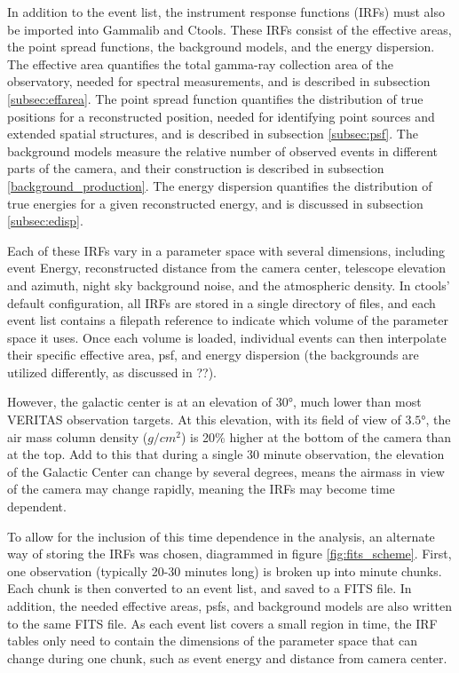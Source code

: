 In addition to the event list, the instrument response functions (IRFs) must also be imported into Gammalib and Ctools.
These IRFs consist of the effective areas, the point spread functions, the background models, and the energy dispersion.
The effective area quantifies the total gamma-ray collection area of the observatory, needed for spectral measurements, and is described in subsection \ref{subsec:effarea}.
The point spread function quantifies the distribution of true positions for a reconstructed position, needed for identifying point sources and extended spatial structures, and is described in subsection \ref{subsec:psf}.
The background models measure the relative number of observed events in different parts of the camera, and their construction is described in subsection \ref{background_production}.
The energy dispersion quantifies the distribution of true energies for a given reconstructed energy, and is discussed in subsection \ref{subsec:edisp}.

Each of these IRFs vary in a parameter space with several dimensions, including event Energy, reconstructed distance from the camera center, telescope elevation and azimuth, night sky background noise, and the atmospheric density.
In ctools' default configuration, all IRFs are stored in a single directory of files, and each event list contains a filepath reference to indicate which volume of the parameter space it uses.
Once each volume is loaded, individual events can then interpolate their specific effective area, psf, and energy dispersion (the backgrounds are utilized differently, as discussed in ??).

However, the galactic center is at an elevation of $\ang{30}$, much lower than most VERITAS observation targets.
At this elevation, with its field of view of $\ang{3.5}$, the air mass column density ($g/cm^{2}$) is 20\% higher at the bottom of the camera than at the top.
Add to this that during a single 30 minute observation, the elevation of the Galactic Center can change by several degrees, means the airmass in view of the camera may change rapidly, meaning the IRFs may become time dependent.

To allow for the inclusion of this time dependence in the analysis, an alternate way of storing the IRFs was chosen, diagrammed in figure \ref{fig:fits_scheme}.
First, one observation (typically 20-30 minutes long) is broken up into  minute chunks.
Each chunk is then converted to an event list, and saved to a FITS file.
In addition, the needed effective areas, psfs, and background models are also written to the same FITS file.
As each event list covers a small region in time, the IRF tables only need to contain the dimensions of the parameter space that can change during one chunk, such as event energy and distance from camera center.

